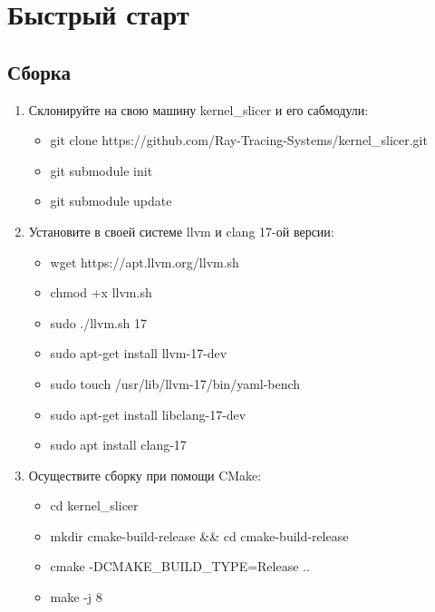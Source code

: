 \documentclass[11pt,fleqn,english,russian]{report} %
\begin{document}


\chapter{Быстрый старт}

\section{Сборка}

\begin{enumerate}
	
\item Склонируйте на свою машину kernel\_slicer и его сабмодули: \begin{itemize}
	\item git clone https://github.com/Ray-Tracing-Systems/kernel\_slicer.git
	\item git submodule init
	\item git submodule update
\end{itemize}

\item Установите в своей системе llvm и clang 17-ой версии: \begin{itemize}
	\item wget https://apt.llvm.org/llvm.sh
	\item chmod +x llvm.sh
	\item sudo ./llvm.sh 17
	\item sudo apt-get install llvm-17-dev
	\item sudo touch /usr/lib/llvm-17/bin/yaml-bench
	\item sudo apt-get install libclang-17-dev
	\item sudo apt install clang-17
\end{itemize}

\item Осуществите сборку при помощи CMake: 
\begin{itemize}
	\item cd kernel\_slicer
    \item mkdir cmake-build-release \&\& cd cmake-build-release
    \item cmake -DCMAKE\_BUILD\_TYPE=Release .. 
    \item make -j 8
\end{itemize}

\end{enumerate}
\end{document}
